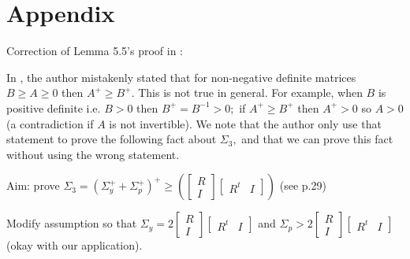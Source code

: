 \documentclass[11pt]{article}
\newcommand{\Z}{\mathbb{Z}}
\begin{document}
\section*{Appendix}
     Correction of Lemma 5.5's proof in \cite{MP}:

     In \cite{MP}, the author mistakenly stated that for non-negative definite matrices $B\geq A \geq 0$ then $A^{+} \geq B^{+}. $ This is not true in general. For example, when $B$ is positive definite i.e. $B> 0$ then $B^{+} = B^{-1} > 0;$ if $A^{+} \geq B^{+} $ then $A^{+} > 0$ so $A> 0$ (a contradiction if $A$ is not invertible). We note that the author only use that statement to prove the following fact about $\Sigma_3,$ and that we can prove this fact without using the wrong statement.
     
     Aim: prove $\Sigma_3 = (\Sigma_y^{+} + \Sigma_p^{+})^{+} \geq (\begin{bmatrix} R \\ I\end{bmatrix} \begin{bmatrix} R^t & I\end{bmatrix} )$ (see p.29)
     
     Modify assumption so that $\Sigma_y =  2\begin{bmatrix} R \\ I\end{bmatrix} \begin{bmatrix} R^t & I\end{bmatrix}  $ and $\Sigma_p > 2\begin{bmatrix} R \\ I\end{bmatrix} \begin{bmatrix} R^t & I\end{bmatrix} $ (okay with our application).
     
\end{document}
